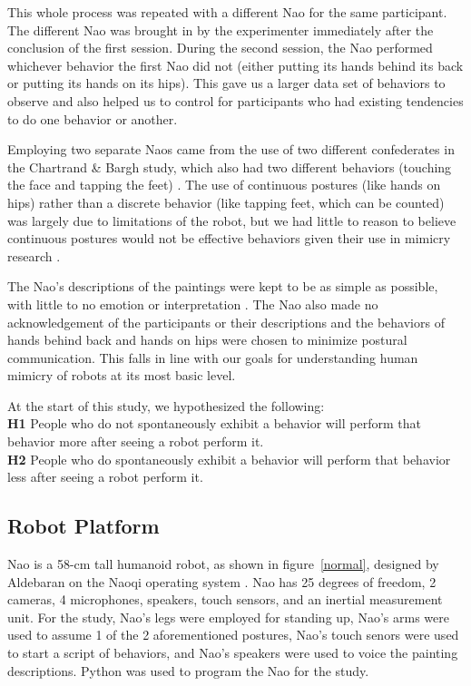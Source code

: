 \documentclass{acm_proc_article-sp}
\begin{document}
This whole process was repeated with a different Nao for the same participant. The different Nao was brought in by the experimenter immediately after the conclusion of the first session. During the second session, the Nao performed whichever behavior the first Nao did not (either putting its hands behind its back or putting its hands on its hips). This gave us a larger data set of behaviors to observe and also helped us to control for participants who had existing tendencies to do one behavior or another.

Employing two separate Naos came from the use of two different confederates in the Chartrand \& Bargh study, which also had two different behaviors (touching the face and tapping the feet) \cite{chartrand1999chameleon}. The use of continuous postures (like hands on hips) rather than a discrete behavior (like tapping feet, which can be counted) was largely due to limitations of the robot, but we had little to reason to believe continuous postures would not be effective behaviors given their use in mimicry research \cite{chartrand2013antecedents}. 

The Nao's descriptions of the paintings were kept to be as simple as possible, with little to no emotion or interpretation \cite{hofree2014bridging}. The Nao also made no acknowledgement of the participants or their descriptions and the behaviors of hands behind back and hands on hips were chosen to minimize postural communication. This falls in line with our goals for understanding human mimicry of robots at its most basic level.

At the start of this study, we hypothesized the following:\\
\textbf{H1}	People who do not spontaneously exhibit a behavior will perform that behavior more after seeing a robot perform it.\\
\textbf{H2} People who do spontaneously exhibit a behavior will perform that behavior less after seeing a robot perform it.

\subsection{Robot Platform}
Nao is a 58-cm tall humanoid robot, as shown in figure~\ref{normal}, designed by Aldebaran on the Naoqi operating system \cite{naodocumentation}. Nao has 25 degrees of freedom, 2 cameras, 4 microphones, speakers, touch sensors, and an inertial measurement unit. For the study, Nao's legs were employed for standing up, Nao's arms were used to assume 1 of the 2 aforementioned postures, Nao's touch senors were used to start a script of behaviors, and Nao's speakers were used to voice the painting descriptions. Python was used to program the Nao for the study. 
\end{document}
